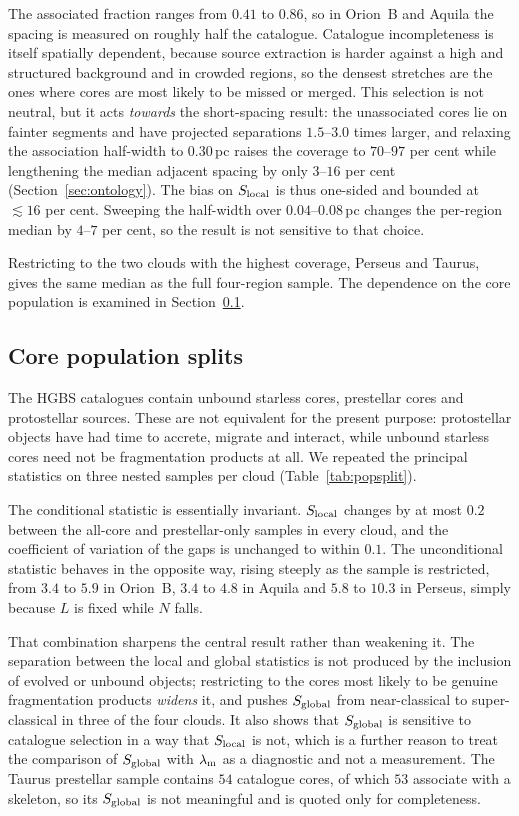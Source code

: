 \documentclass[usenatbib,twoside,twocolumn]{mnras}
\begin{document}
The associated fraction ranges from $0.41$ to $0.86$, so in Orion~B and Aquila the spacing is measured on roughly half the catalogue. Catalogue incompleteness is itself spatially dependent, because source extraction is harder against a high and structured background and in crowded regions, so the densest stretches are the ones where cores are most likely to be missed or merged. This selection is not neutral, but it acts \emph{towards} the short-spacing result: the unassociated cores lie on fainter segments and have projected separations $1.5$--$3.0$ times larger, and relaxing the association half-width to $0.30$\,pc raises the coverage to $70$--$97$ per cent while lengthening the median adjacent spacing by only $3$--$16$ per cent (Section~\ref{sec:ontology}). The bias on $S_{\rm local}$ is thus one-sided and bounded at $\lesssim16$ per cent. Sweeping the half-width over $0.04$--$0.08$\,pc changes the per-region median by $4$--$7$ per cent, so the result is not sensitive to that choice.

Restricting to the two clouds with the highest coverage, Perseus and Taurus, gives the same median as the full four-region sample. The dependence on the core population is examined in Section~\ref{sec:popsplit}.


\subsection{Core population splits}
\label{sec:popsplit}

The HGBS catalogues contain unbound starless cores, prestellar cores and protostellar sources. These are not equivalent for the present purpose: protostellar objects have had time to accrete, migrate and interact, while unbound starless cores need not be fragmentation products at all. We repeated the principal statistics on three nested samples per cloud (Table~\ref{tab:popsplit}).

The conditional statistic is essentially invariant. $S_{\rm local}$ changes by at most $0.2$ between the all-core and prestellar-only samples in every cloud, and the coefficient of variation of the gaps is unchanged to within $0.1$. The unconditional statistic behaves in the opposite way, rising steeply as the sample is restricted, from $3.4$ to $5.9$ in Orion~B, $3.4$ to $4.8$ in Aquila and $5.8$ to $10.3$ in Perseus, simply because $L$ is fixed while $N$ falls.

That combination sharpens the central result rather than weakening it. The separation between the local and global statistics is not produced by the inclusion of evolved or unbound objects; restricting to the cores most likely to be genuine fragmentation products \emph{widens} it, and pushes $S_{\rm global}$ from near-classical to super-classical in three of the four clouds. It also shows that $S_{\rm global}$ is sensitive to catalogue selection in a way that $S_{\rm local}$ is not, which is a further reason to treat the comparison of $S_{\rm global}$ with $\lambda_{\rm m}$ as a diagnostic and not a measurement. The Taurus prestellar sample contains $54$ catalogue cores, of which $53$ associate with a skeleton, so its $S_{\rm global}$ is not meaningful and is quoted only for completeness.
\end{document}
